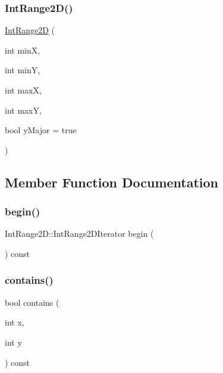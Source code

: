 \subsubsection{\texorpdfstring{Int\+Range2\+D()}{IntRange2D()}\hspace{0.1cm}{\footnotesize\ttfamily [2/2]}}
{\footnotesize\ttfamily \mbox{\hyperlink{classIntRange2D}{Int\+Range2D}} (\begin{DoxyParamCaption}\item[{int}]{minX,  }\item[{int}]{minY,  }\item[{int}]{maxX,  }\item[{int}]{maxY,  }\item[{bool}]{y\+Major = {\ttfamily true} }\end{DoxyParamCaption})}



\subsection{Member Function Documentation}
\mbox{\label{classIntRange2D_a5840f252f949c3f9c0bd1085250a8615}} 
\subsubsection{\texorpdfstring{begin()}{begin()}}
{\footnotesize\ttfamily Int\+Range2\+D\+::\+Int\+Range2\+D\+Iterator begin (\begin{DoxyParamCaption}{ }\end{DoxyParamCaption}) const}

\mbox{\label{classIntRange2D_a39725eb73188fbf2a4b790b1a6849815}} 
\subsubsection{\texorpdfstring{contains()}{contains()}\hspace{0.1cm}{\footnotesize\ttfamily [1/2]}}
{\footnotesize\ttfamily bool contains (\begin{DoxyParamCaption}\item[{int}]{x,  }\item[{int}]{y }\end{DoxyParamCaption}) const}

